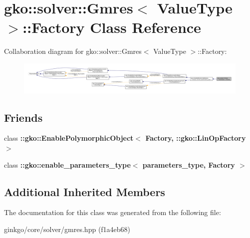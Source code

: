 \hypertarget{classgko_1_1solver_1_1Gmres_1_1Factory}{}\section{gko\+:\+:solver\+:\+:Gmres$<$ Value\+Type $>$\+:\+:Factory Class Reference}
\label{classgko_1_1solver_1_1Gmres_1_1Factory}


Collaboration diagram for gko\+:\+:solver\+:\+:Gmres$<$ Value\+Type $>$\+:\+:Factory\+:
\nopagebreak
\begin{figure}[H]
\begin{center}
\leavevmode
\includegraphics[width=350pt]{classgko_1_1solver_1_1Gmres_1_1Factory__coll__graph}
\end{center}
\end{figure}
\subsection*{Friends}
\begin{DoxyCompactItemize}
\item 
\mbox{\label{classgko_1_1solver_1_1Gmres_1_1Factory_a27e9bbc94a1c1c59f40833153eda8f78}} 
class {\bfseries \+::gko\+::\+Enable\+Polymorphic\+Object$<$ Factory, \+::gko\+::\+Lin\+Op\+Factory $>$}
\item 
\mbox{\label{classgko_1_1solver_1_1Gmres_1_1Factory_a0d176cbd42d6214e11aee8c30ca256fc}} 
class {\bfseries \+::gko\+::enable\+\_\+parameters\+\_\+type$<$ parameters\+\_\+type, Factory $>$}
\end{DoxyCompactItemize}
\subsection*{Additional Inherited Members}


The documentation for this class was generated from the following file\+:\begin{DoxyCompactItemize}
\item 
ginkgo/core/solver/gmres.\+hpp (f1a4eb68)\end{DoxyCompactItemize}
